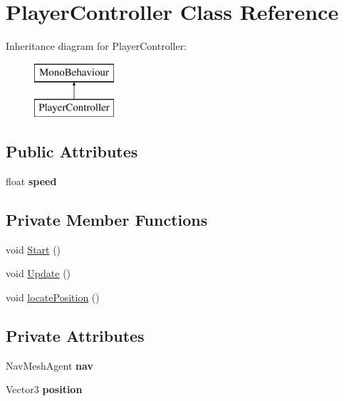 \hypertarget{class_player_controller}{}\section{Player\+Controller Class Reference}
\label{class_player_controller}
Inheritance diagram for Player\+Controller\+:\begin{figure}[H]
\begin{center}
\leavevmode
\includegraphics[height=2.000000cm]{class_player_controller}
\end{center}
\end{figure}
\subsection*{Public Attributes}
\begin{DoxyCompactItemize}
\item 
\mbox{\label{class_player_controller_a0928605583f0563cd84fe43119d336ec}} 
float {\bfseries speed}
\end{DoxyCompactItemize}
\subsection*{Private Member Functions}
\begin{DoxyCompactItemize}
\item 
void \hyperlink{class_player_controller_ae1117d9c4da3193181cddad2c814e467}{Start} ()
\item 
void \hyperlink{class_player_controller_ae8bc83dffb99867a04be016473ed2c43}{Update} ()
\item 
void \hyperlink{class_player_controller_a0c8df63dcb61c214981ae2622f52ef3e}{locate\+Position} ()
\end{DoxyCompactItemize}
\subsection*{Private Attributes}
\begin{DoxyCompactItemize}
\item 
\mbox{\label{class_player_controller_a468ffe6527140457a4b6e7b2bc354410}} 
Nav\+Mesh\+Agent {\bfseries nav}
\item 
\mbox{\label{class_player_controller_a343004d4525a82ef7094885e01a59bab}} 
Vector3 {\bfseries position}
\end{DoxyCompactItemize}


